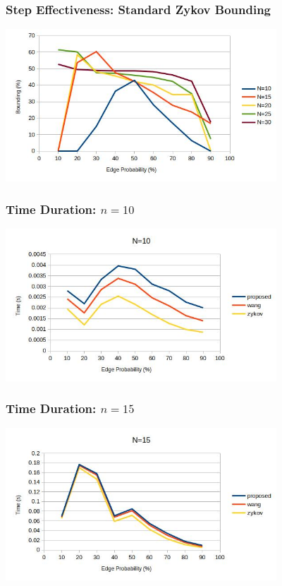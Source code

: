 \documentclass{beamer}
\begin{document}
\begin{frame}
  \frametitle{Step Effectiveness: Standard Zykov Bounding}
  \begin{center}
    \includegraphics[width=4in]{../final/qz_bounding}
  \end{center}
\end{frame}

\begin{frame}
  \frametitle{Time Duration: \(n=10\)}
  \begin{center}
    \includegraphics[width=4in]{../final/duration_10}
  \end{center}
\end{frame}

\begin{frame}
  \frametitle{Time Duration: \(n=15\)}
  \begin{center}
    \includegraphics[width=4in]{../final/duration_15}
  \end{center}
\end{frame}
\end{document}
